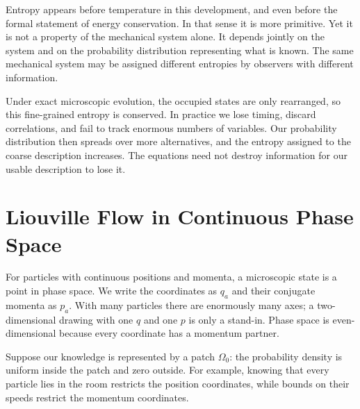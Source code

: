 Entropy appears before temperature in this development, and even before the
formal statement of energy conservation. In that sense it is more primitive.
Yet it is not a property of the mechanical system alone. It depends jointly
on the system and on the probability distribution representing what is
known. The same mechanical system may be assigned different entropies by
observers with different information.

Under exact microscopic evolution, the occupied states are only rearranged,
so this fine-grained entropy is conserved. In practice we lose timing,
discard correlations, and fail to track enormous numbers of variables. Our
probability distribution then spreads over more alternatives, and the
entropy assigned to the coarse description increases. The equations need
not destroy information for our usable description to lose it.

\begin{classroomqa}
\end{classroomqa}

\section{Liouville Flow in Continuous Phase Space}

For particles with continuous positions and momenta, a microscopic state is
a point in phase space. We write the coordinates as \(q_a\) and their
conjugate momenta as \(p_a\). With many particles there are enormously many
axes; a two-dimensional drawing with one \(q\) and one \(p\) is only a
stand-in. Phase space is even-dimensional because every coordinate has a
momentum partner.

Suppose our knowledge is represented by a patch \(\Omega_0\): the probability
density is uniform inside the patch and zero outside. For example, knowing
that every particle lies in the room restricts the position coordinates,
while bounds on their speeds restrict the momentum coordinates.

